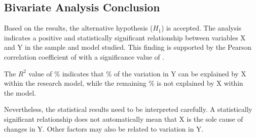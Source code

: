 \subsection{Bivariate Analysis Conclusion}

Based on the results, the alternative hypothesis ($H_1$) is accepted. The
analysis indicates a positive and statistically significant relationship
between variables X and Y in the sample and model studied. This finding
is supported by the Pearson correlation coefficient of \resR{} with a
significance value of \resSig{}.

The $R^2$ value of \resRSquaredPct\% indicates that \resRSquaredPct\% of
the variation in Y
can be explained by X within the research model, while the remaining
\resUnexplainedPct\% is not explained by X within the model.

Nevertheless, the statistical results need to be interpreted carefully. A
statistically significant relationship does not automatically mean that X
is the sole cause of changes in Y. Other factors may also be related to
variation in Y.
